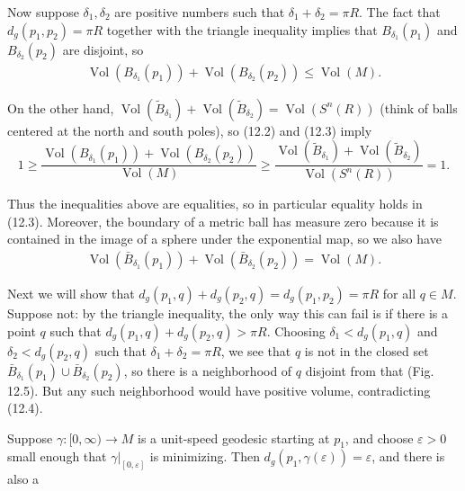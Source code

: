 Now suppose $\delta_1, \delta_2$ are positive numbers such that $\delta_1 + \delta_2 = \pi R$. The fact that $d_g(p_1, p_2) = \pi R$ together with the triangle inequality implies that $B_{\delta_1}(p_1)$ and $B_{\delta_2}(p_2)$ are disjoint, so
\begin{align}
\operatorname{Vol}(B_{\delta_1}(p_1)) + \operatorname{Vol}(B_{\delta_2}(p_2)) \leq \operatorname{Vol}(M).
\label{eq:12.3}
\end{align}

On the other hand, $\operatorname{Vol}(\tilde{B}_{\delta_1}) + \operatorname{Vol}(\tilde{B}_{\delta_2}) = \operatorname{Vol}(S^n(R))$ (think of balls centered at the north and south poles), so (12.2) and (12.3) imply
\[
1 \geq \frac{\operatorname{Vol}(B_{\delta_1}(p_1)) + \operatorname{Vol}(B_{\delta_2}(p_2))}{\operatorname{Vol}(M)} \geq \frac{\operatorname{Vol}(\tilde{B}_{\delta_1}) + \operatorname{Vol}(\tilde{B}_{\delta_2})}{\operatorname{Vol}(S^n(R))} = 1.
\]

Thus the inequalities above are equalities, so in particular equality holds in (12.3). Moreover, the boundary of a metric ball has measure zero because it is contained in the image of a sphere under the exponential map, so we also have
\begin{align}
\operatorname{Vol}(\bar{B}_{\delta_1}(p_1)) + \operatorname{Vol}(\bar{B}_{\delta_2}(p_2)) = \operatorname{Vol}(M).
\label{eq:12.4}
\end{align}

Next we will show that $d_g(p_1, q) + d_g(p_2, q) = d_g(p_1, p_2) = \pi R$ for all $q \in M$. Suppose not: by the triangle inequality, the only way this can fail is if there is a point $q$ such that $d_g(p_1, q) + d_g(p_2, q) > \pi R$. Choosing $\delta_1 < d_g(p_1, q)$ and $\delta_2 < d_g(p_2, q)$ such that $\delta_1 + \delta_2 = \pi R$, we see that $q$ is not in the closed set $\bar{B}_{\delta_1}(p_1) \cup \bar{B}_{\delta_2}(p_2)$, so there is a neighborhood of $q$ disjoint from that (Fig. 12.5). But any such neighborhood would have positive volume, contradicting (12.4).

Suppose $\gamma: [0, \infty) \to M$ is a unit-speed geodesic starting at $p_1$, and choose $\varepsilon > 0$ small enough that $\gamma|_{[0, \varepsilon]}$ is minimizing. Then $d_g(p_1, \gamma(\varepsilon)) = \varepsilon$, and there is also a


